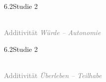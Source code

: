 \documentclass[xcolor=table,9pt,aspectratio=169]{beamer}
\begin{document}
\begin{frame}{\vspace*{10mm}6.2\hspace*{1em}Studie 2}
\begin{center}
   \\
   \textcolor{gray}{Additivität \textit{Würde -- Autonomie}}
\end{center}
\end{frame}


\begin{frame}{\vspace*{10mm}6.2\hspace*{1em}Studie 2}
\begin{center}
   \\
   \textcolor{gray}{Additivität \textit{Überleben -- Teilhabe}}
\end{center}
\end{frame}
\end{document}
